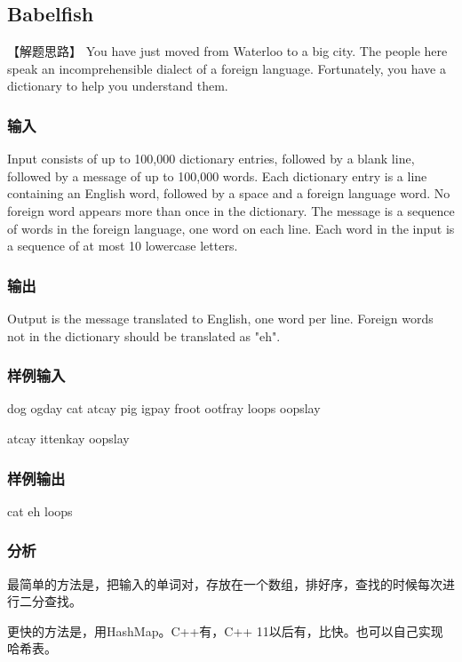 \subsection{Babelfish}


【解题思路】
You have just moved from Waterloo to a big city. The people here speak an incomprehensible dialect of a foreign language. Fortunately, you have a dictionary to help you understand them.


\subsubsection{输入}
Input consists of up to 100,000 dictionary entries, followed by a blank line, followed by a message of up to 100,000 words. Each dictionary entry is a line containing an English word, followed by a space and a foreign language word. No foreign word appears more than once in the dictionary. The message is a sequence of words in the foreign language, one word on each line. Each word in the input is a sequence of at most 10 lowercase letters.


\subsubsection{输出}
Output is the message translated to English, one word per line. Foreign words not in the dictionary should be translated as "eh".


\subsubsection{样例输入}
\begin{Code}
dog ogday
cat atcay
pig igpay
froot ootfray
loops oopslay

atcay
ittenkay
oopslay
\end{Code}


\subsubsection{样例输出}
\begin{Code}
cat
eh
loops
\end{Code}


\subsubsection{分析}
最简单的方法是，把输入的单词对，存放在一个数组，排好序，查找的时候每次进行二分查找。

更快的方法是，用HashMap。C++有，C++ 11以后有，比快。也可以自己实现哈希表。


